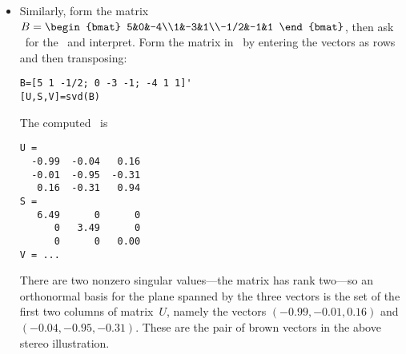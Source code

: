 \begin{example}
\begin{solution}
\begin{itemize}
\item Similarly, form the matrix 
\(B=\begin{bmat} 5&0&-4\\1&-3&1\\-1/2&-1&1 \end{bmat}\),
then ask \script\ for the \svd\ and interpret.
Form the matrix in \script\ by entering the vectors as rows and then transposing:
\begin{verbatim}
B=[5 1 -1/2; 0 -3 -1; -4 1 1]'
[U,S,V]=svd(B)
\end{verbatim}
\setbox\ajrqrbox\hbox{}%
\marginajrbox%
The computed \svd\ is \twodp
\begin{verbatim}
U =
  -0.99  -0.04   0.16
  -0.01  -0.95  -0.31
   0.16  -0.31   0.94
S =
   6.49      0      0
      0   3.49      0
      0      0   0.00
V = ...
\end{verbatim}
There are two nonzero singular values---the matrix has rank two---so an orthonormal basis for the plane spanned by the three vectors is the set of the first two columns of matrix~\(U\), namely the vectors  \((-0.99,-0.01,0.16)\) and \((-0.04,-0.95,-0.31)\).
These are the pair of brown vectors in the above stereo illustration.
\end{itemize} 
\end{solution}
\end{example}




